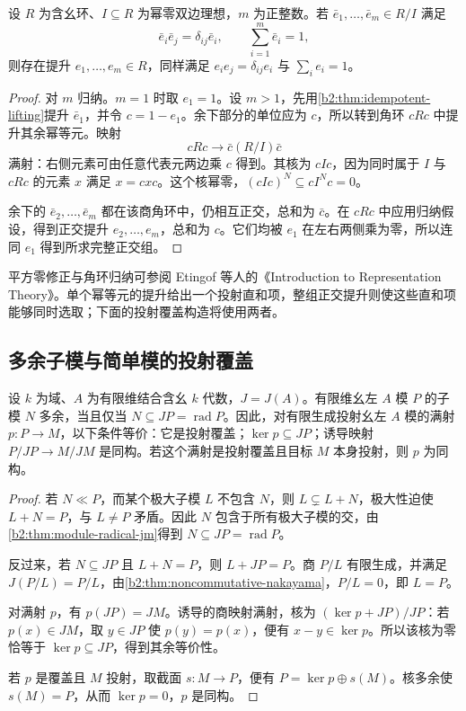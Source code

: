 \begin{theorem}\label{b2:thm:orthogonal-idempotent-lifting}
	设 \(R\) 为含幺环、\(I\subseteq R\) 为幂零双边理想，\(m\) 为正整数。若 \(\bar e_1,\ldots,\bar e_m\in R/I\) 满足
	\[
		\bar e_i\bar e_j=\delta_{ij}\bar e_i, \qquad \sum_{i=1}^m\bar e_i=1,
	\]
	则存在提升 \(e_1,\ldots,e_m\in R\)，同样满足 \(e_ie_j=\delta_{ij}e_i\) 与 \(\sum_i e_i=1\)。
\end{theorem}
\begin{proof}
	对 \(m\) 归纳。\(m=1\) 时取 \(e_1=1\)。设 \(m>1\)，先用\cref{b2:thm:idempotent-lifting}提升 \(\bar e_1\)，并令 \(c=1-e_1\)。余下部分的单位应为 \(c\)，所以转到角环 \(cRc\) 中提升其余幂等元。映射
	\[
		cRc\longrightarrow\bar c(R/I)\bar c
	\]
	满射：右侧元素可由任意代表元两边乘 \(c\) 得到。其核为 \(cIc\)，因为同时属于 \(I\) 与 \(cRc\) 的元素 \(x\) 满足 \(x=cxc\)。这个核幂零，\((cIc)^N\subseteq cI^Nc=0\)。

	余下的 \(\bar e_2,\ldots,\bar e_m\) 都在该商角环中，仍相互正交，总和为 \(\bar c\)。在 \(cRc\) 中应用归纳假设，得到正交提升 \(e_2,\ldots,e_m\)，总和为 \(c\)。它们均被 \(e_1\) 在左右两侧乘为零，所以连同 \(e_1\) 得到所求完整正交组。
\end{proof}

平方零修正与角环归纳可参阅 Etingof 等人的《Introduction to Representation Theory》\cite[Proposition 9.1.1; Corollary 9.1.3, pp. 209--210]{EtingofEtAl2011RepresentationTheory}。单个幂等元的提升给出一个投射直和项，整组正交提升则使这些直和项能够同时选取；下面的投射覆盖构造将使用两者。

\subsection{多余子模与简单模的投射覆盖}
\label{b2:subsec:1503:03}

\begin{proposition}\label{b2:prop:finite-superfluous-radical}
	设 \(k\) 为域、\(A\) 为有限维结合含幺 \(k\) 代数，\(J=J(A)\)。有限维幺左 \(A\) 模 \(P\) 的子模 \(N\) 多余，当且仅当 \(N\subseteq JP=\operatorname{rad}P\)。因此，对有限生成投射幺左 \(A\) 模的满射 \(p:P\to M\)，以下条件等价：它是投射覆盖；\(\ker p\subseteq JP\)；诱导映射 \(P/JP\to M/JM\) 是同构。若这个满射是投射覆盖且目标 \(M\) 本身投射，则 \(p\) 为同构。
\end{proposition}
\begin{proof}
	若 \(N\ll P\)，而某个极大子模 \(L\) 不包含 \(N\)，则 \(L\subsetneq L+N\)，极大性迫使 \(L+N=P\)，与 \(L\ne P\) 矛盾。因此 \(N\) 包含于所有极大子模的交，由\cref{b2:thm:module-radical-jm}得到 \(N\subseteq JP=\operatorname{rad}P\)。

	反过来，若 \(N\subseteq JP\) 且 \(L+N=P\)，则 \(L+JP=P\)。商 \(P/L\) 有限生成，并满足 \(J(P/L)=P/L\)，由\cref{b2:thm:noncommutative-nakayama}，\(P/L=0\)，即 \(L=P\)。

	对满射 \(p\)，有 \(p(JP)=JM\)。诱导的商映射满射，核为 \((\ker p+JP)/JP\)：若 \(p(x)\in JM\)，取 \(y\in JP\) 使 \(p(y)=p(x)\)，便有 \(x-y\in\ker p\)。所以该核为零恰等于 \(\ker p\subseteq JP\)，得到其余等价性。

	若 \(p\) 是覆盖且 \(M\) 投射，取截面 \(s:M\to P\)，便有 \(P=\ker p\oplus s(M)\)。核多余使 \(s(M)=P\)，从而 \(\ker p=0\)，\(p\) 是同构。
\end{proof}

